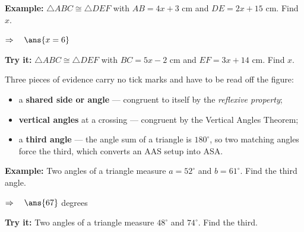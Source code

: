 \documentclass[12pt]{article}
\begin{document}
\begin{examplebox}
\textbf{Example:} \quad $\triangle ABC \cong \triangle DEF$ with $AB = 4x + 3$ cm and $DE = 2x + 15$ cm. Find $x$.

$\Rightarrow\quad \ans{x = 6}$
\end{examplebox}

\begin{tryitbox}
\textbf{Try it:} \quad $\triangle ABC \cong \triangle DEF$ with $BC = 5x - 2$ cm and $EF = 3x + 14$ cm. Find $x$.\\[2pt]
\end{tryitbox}


\begin{formulabox}
Three pieces of evidence carry no tick marks and have to be read off the figure:\par
\begin{itemize}[leftmargin=1.1cm, itemsep=0pt, topsep=1pt]
  \item a \textbf{shared side or angle} --- congruent to itself by the \emph{reflexive property};
  \item \textbf{vertical angles} at a crossing --- congruent by the Vertical Angles Theorem;
  \item a \textbf{third angle} --- the angle sum of a triangle is $180^\circ$, so two matching angles force the third, which converts an AAS setup into ASA.
\end{itemize}
\end{formulabox}

\begin{examplebox}
\textbf{Example:} \quad Two angles of a triangle measure $a = 52^\circ$ and $b = 61^\circ$. Find the third angle.

$\Rightarrow\quad \ans{67}$ degrees
\end{examplebox}

\begin{tryitbox}
\textbf{Try it:} \quad Two angles of a triangle measure $48^\circ$ and $74^\circ$. Find the third.\\[2pt]
\end{tryitbox}
\end{document}
